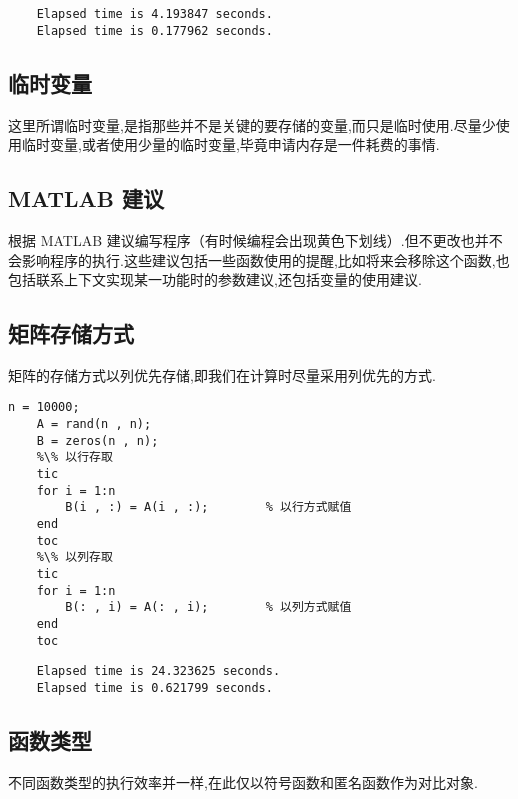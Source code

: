   \vspace{-0.8cm}
  \begin{lstlisting}
    Elapsed time is 4.193847 seconds.
    Elapsed time is 0.177962 seconds.
  \end{lstlisting}



\subsection{临时变量}
 这里所谓临时变量,是指那些并不是关键的要存储的变量,而只是临时使用.尽量少使用临时变量,或者使用少量的临时变量,毕竟申请内存是一件耗费的事情.



\subsection{MATLAB 建议}
 根据 MATLAB 建议编写程序（有时候编程会出现黄色下划线）.但不更改也并不会影响程序的执行.这些建议包括一些函数使用的提醒,比如将来会移除这个函数,也包括联系上下文实现某一功能时的参数建议,还包括变量的使用建议.



\subsection{矩阵存储方式}
 矩阵的存储方式以列优先存储,即我们在计算时尽量采用列优先的方式.

  \vspace{-0.8cm}
  \begin{lstlisting}[caption = 矩阵不同存取方式效率对比]
    n = 10000;
    A = rand(n , n);
    B = zeros(n , n);
    %\% 以行存取
    tic
    for i = 1:n
        B(i , :) = A(i , :);        % 以行方式赋值 
    end
    toc
    %\% 以列存取
    tic
    for i = 1:n
        B(: , i) = A(: , i);        % 以列方式赋值
    end
    toc
  \end{lstlisting}

  \vspace{-0.8cm}
  \begin{lstlisting}
    Elapsed time is 24.323625 seconds.
    Elapsed time is 0.621799 seconds.
  \end{lstlisting}

\subsection{函数类型}
 不同函数类型的执行效率并一样,在此仅以符号函数和匿名函数作为对比对象.

